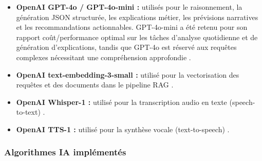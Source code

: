 \documentclass[a4paper,12pt]{report}
\begin{document}
\begin{itemize}
    \item \textbf{OpenAI GPT-4o / GPT-4o-mini :} utilisés pour le raisonnement,
    la génération JSON structurée, les explications métier, les prévisions
    narratives et les recommandations actionnables. GPT-4o-mini a été retenu pour
    son rapport coût/performance optimal sur les tâches d'analyse quotidienne et de génération d'explications, tandis que GPT-4o est réservé aux requêtes complexes nécessitant une compréhension approfondie \cite{A4}\cite{ref45}.

    \item \textbf{OpenAI text-embedding-3-small :} utilisé pour la vectorisation
    des requêtes et des documents dans le pipeline RAG \cite{ref43}.

    \item \textbf{OpenAI Whisper-1 :} utilisé pour la transcription audio en
    texte (speech-to-text) \cite{ref42}.

    \item \textbf{OpenAI TTS-1 :} utilisé pour la synthèse vocale (text-to-speech) \cite{ref44}.
\end{itemize}

\subsubsection{Algorithmes IA implémentés}
\end{document}
